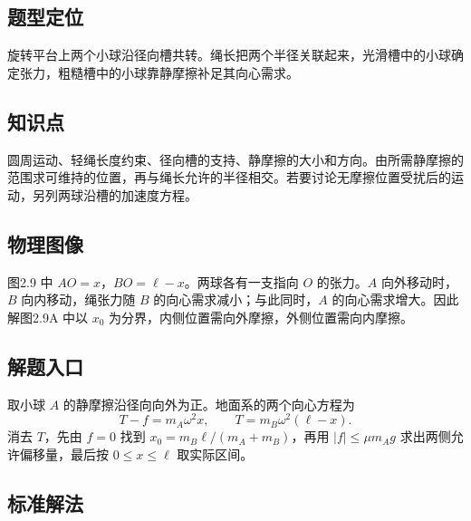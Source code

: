 \documentclass[UTF8,fontset=fandol,a4paper,11pt]{ctexart}
\begin{document}


\subsection*{题型定位}

旋转平台上两个小球沿径向槽共转。绳长把两个半径关联起来，光滑槽中的小球确定张力，粗糙槽中的小球靠静摩擦补足其向心需求。



\subsection*{知识点}

圆周运动、轻绳长度约束、径向槽的支持、静摩擦的大小和方向。由所需静摩擦的范围求可维持的位置，再与绳长允许的半径相交。若要讨论无摩擦位置受扰后的运动，另列两球沿槽的加速度方程。




\subsection*{物理图像}

图2.9 中 $AO=x$，$BO=\ell-x$。两球各有一支指向 $O$ 的张力。$A$ 向外移动时，$B$ 向内移动，绳张力随 $B$ 的向心需求减小；与此同时，$A$ 的向心需求增大。因此解图2.9A 中以 $x_0$ 为分界，内侧位置需向外摩擦，外侧位置需向内摩擦。



\subsection*{解题入口}

取小球 $A$ 的静摩擦沿径向向外为正。地面系的两个向心方程为
\[
T-f=m_A\omega^2x,\qquad T=m_B\omega^2(\ell-x).
\]
消去 $T$，先由 $f=0$ 找到 $x_0=m_B\ell/(m_A+m_B)$，再用 $|f|\leq\mu m_Ag$ 求出两侧允许偏移量，最后按 $0\leq x\leq\ell$ 取实际区间。



\subsection*{标准解法}
\end{document}

